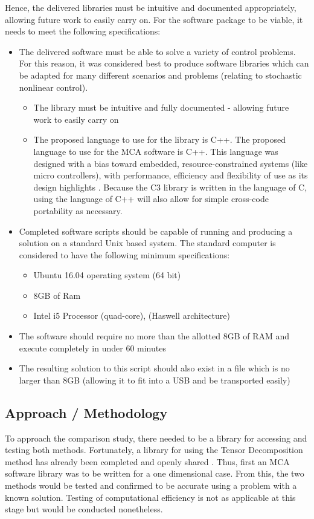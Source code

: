 \documentclass[11pt,draftd]{article}
\begin{document}
Hence, the delivered libraries must be intuitive and documented appropriately, allowing future work to easily carry on. For the software package to be viable, it needs to meet the following specifications:
\begin{itemize}
	\item The delivered software must be able to solve a variety of control problems. For this reason, it was considered best to produce software libraries which can be adapted for many different scenarios and problems (relating to stochastic nonlinear control).
	\begin{itemize}
		\item The library must be intuitive and fully documented - allowing future work to easily carry on
		\item The proposed language to use for the library is C++.  The proposed language to use for the MCA software is C++. This language was designed with a bias toward embedded, resource-constrained systems (like micro controllers), with performance, efficiency and flexibility of use as its design highlights \cite{c++film}. Because the C3 library is written in the language of C, using the language of C++ will also allow for simple cross-code portability as necessary.
	\end{itemize}
	\item Completed software scripts should be capable of running and producing a solution on a standard Unix based system. The standard computer is considered to have the following minimum specifications:
	\begin{itemize}
		\item Ubuntu 16.04 operating system (64 bit)
		\item 8GB of Ram
		\item Intel i5 Processor (quad-core), (Haswell architecture)
	\end{itemize}
	\item The software should require no more than the allotted 8GB of RAM and execute completely in under 60 minutes
	\item The resulting solution to this script should also exist in a file which is no larger than 8GB (allowing it to fit into a USB and be transported easily)
\end{itemize}

\noindent

\subsection{Approach / Methodology}
To approach the comparison study, there needed to be a library for accessing and testing both methods. Fortunately, a library for using the Tensor Decomposition method has already been completed and openly shared \cite{c3c} \cite{c3cs}. Thus, first an MCA software library was to be written for a one dimensional case. From this, the two methods would be tested and confirmed to be accurate using a problem with a known solution. Testing of computational efficiency is not as applicable at this stage but would be conducted nonetheless.\\
\end{document}
